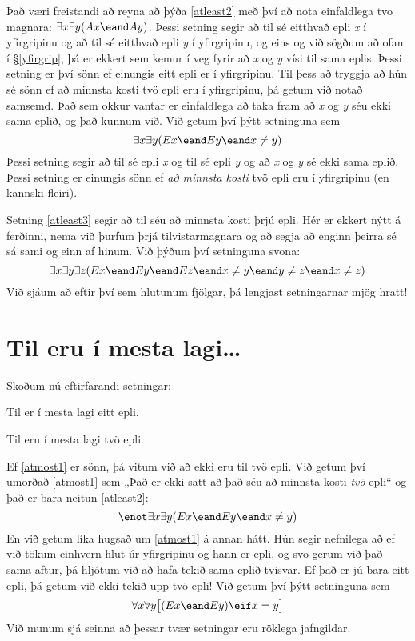 Það væri freistandi að reyna að þýða \ref{atleast2} með því að nota einfaldlega tvo magnara: $\exists x \exists y(Ax \eand Ay)$. Þessi setning segir að til sé eitthvað epli \emph{x} í yfirgripinu og að til sé eitthvað epli \emph{y} í yfirgripinu, og eins og við sögðum að ofan í \S\ref{yfirgrip}, þá er ekkert sem kemur í veg fyrir að \emph{x} og \emph{y} vísi til sama eplis. Þessi setning er því sönn ef einungis eitt epli er í yfirgripinu. Til þess að tryggja að hún sé sönn ef að minnsta kosti tvö epli eru í yfirgripinu, þá getum við notað samsemd. Það sem okkur vantar er einfaldlega að taka fram að \emph{x} og \emph{y} séu ekki sama eplið, og það kunnum við. Við getum því þýtt setninguna sem $$\exists x \exists y(Ex \eand Ey \eand x \neq y)$$ Þessi setning segir að til sé epli \emph{x} og til sé epli \emph{y} og að \emph{x} og \emph{y} sé ekki sama eplið. Þessi setning er einungis sönn ef \emph{að minnsta kosti} tvö epli eru í yfirgripinu (en kannski fleiri).

Setning \ref{atleast3} segir að til séu að minnsta kosti þrjú epli. Hér er ekkert nýtt á ferðinni, nema við þurfum þrjá tilvistarmagnara og að segja að enginn þeirra sé sá sami og einn af hinum. Við þýðum því setninguna svona: $$\exists x \exists y\exists z(Ex \eand Ey \eand Ez \eand x \neq y \eand y \neq z \eand x \neq z)$$ Við sjáum að eftir því sem hlutunum fjölgar, þá lengjast setningarnar mjög hratt!

\section{Til eru í mesta lagi\ldots}
Skoðum nú eftirfarandi setningar:
\begin{earg}
	\item[\ex{atmost1}] Til er í mesta lagi eitt epli.
	\item[\ex{atmost2}] Til eru í mesta lagi tvö epli.
\end{earg}
Ef \ref{atmost1} er sönn, þá vitum við að ekki eru til tvö epli. Við getum því umorðað \ref{atmost1} sem „Það er ekki satt að það séu að minnsta kosti \emph{tvö} epli“ og það er bara neitun \ref{atleast2}: $$\enot \exists x \exists y(Ex \eand Ey \eand x \neq y)$$ En við getum líka hugsað um \ref{atmost1} á annan hátt. Hún segir nefnilega að ef við tökum einhvern hlut úr yfirgripinu og hann er epli, og svo gerum við það sama aftur, þá hljótum við að hafa tekið sama eplið tvisvar. Ef það er jú bara eitt epli, þá getum við ekki tekið upp tvö epli! Við getum því þýtt setninguna sem $$\forall x\forall y\bigl[(Ex \eand Ey) \eif x=y\bigr]$$ Við munum sjá seinna að þessar tvær setningar eru röklega jafngildar.

